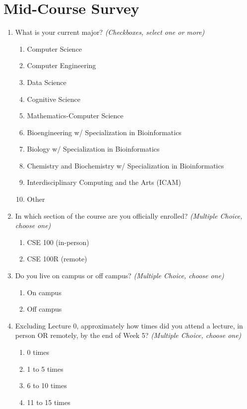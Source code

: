 \chapter{Mid-Course Survey}\label{sec:appendix_b}
\begin{enumerate}
    \item What is your current major? \textit{(Checkboxes, select one or more)}
    \begin{enumerate}
        \item Computer Science
        \item Computer Engineering
        \item Data Science
        \item Cognitive Science
        \item Mathematics-Computer Science
        \item Bioengineering w/ Specialization in Bioinformatics
        \item Biology w/ Specialization in Bioinformatics
        \item Chemistry and Biochemistry w/ Specialization in Bioinformatics
        \item Interdisciplinary Computing and the Arts (ICAM)
        \item Other
    \end{enumerate}

    \item In which section of the course are you officially enrolled? \textit{(Multiple Choice, choose one)}
    \begin{enumerate}
        \item CSE 100 (in-person)
        \item CSE 100R (remote)
    \end{enumerate}

    \item Do you live on campus or off campus? \textit{(Multiple Choice, choose one)}
    \begin{enumerate}
        \item On campus
        \item Off campus
    \end{enumerate}

    \item Excluding Lecture 0, approximately how times did you attend a lecture, in person OR remotely, by the end of Week 5? \textit{(Multiple Choice, choose one)}
    \begin{enumerate}
        \item 0 times
        \item 1 to 5 times
        \item 6 to 10 times
        \item 11 to 15 times
    \end{enumerate}


\end{enumerate}
